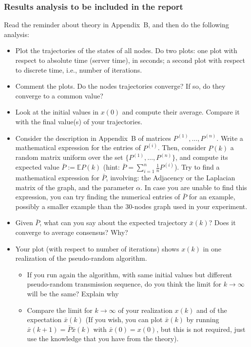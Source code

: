\documentclass[oneside]{article}
\begin{document}
\subsubsection{Results analysis to be included in the report}
Read the reminder about theory in Appendix~B, and then do the following analysis:
\begin{itemize}
\item Plot the trajectories of the states of all nodes. Do two plots: one plot with respect to absolute time (server time), in seconds; a second plot with respect to discrete time, i.e., number of iterations.
\item Comment the plots. Do the nodes trajectories converge? If so, do they converge to a common value?
\item Look at the initial values in $x(0)$ and compute their average. Compare it with the final value(s) of your trajectories.
\item Consider the description in Appendix~B of matrices $P^{(1)}, \dots, P^{(n)} $. Write a mathematical expression for the entries of $P^{(i)}$. Then, consider $P(k)$ a random matrix uniform over the set $\{P^{(1)}, \dots, P^{(n)}\}$, and compute its expected value $\bar P := \mathbb E P(k)$ (hint: $\bar P = \sum_{i=1}^n \frac{1}{n} P^{(i)}$).
Try to find a mathematical expression for $\bar P$, involving: the Adjacency or the Laplacian matrix of the graph, and the parameter $\alpha$.
In case you are unable to find this expression, you can try finding the numerical entries of $\bar P$ for an example, possibly a smaller example than the 30-nodes graph used in your experiment.
\item Given $\bar P$, what can you say about the expected trajectory $\bar x(k)$? Does it converge to average consensus? Why?
\item 
Your plot (with respect to number of iterations) shows $x(k)$ in one realization of the pseudo-random algorithm.
	\begin{itemize}
	\item  If you run again the algorithm, with same initial values but different pseudo-random transmission sequence, do you think the limit for $k\to \infty$ will be the same? Explain why 
	\item Compare the limit for $k \to \infty$ of your realization $x(k)$ and of the expectation $\bar x(k)$ (If you wish, you can plot $\bar x(k)$ by running $\bar x(k+1) = \bar P \bar x(k)$ with $\bar x(0) = x(0)$, but this is not required, just use the knowledge that you have from the theory).
	\end{itemize}
\end{itemize}
\end{document}
